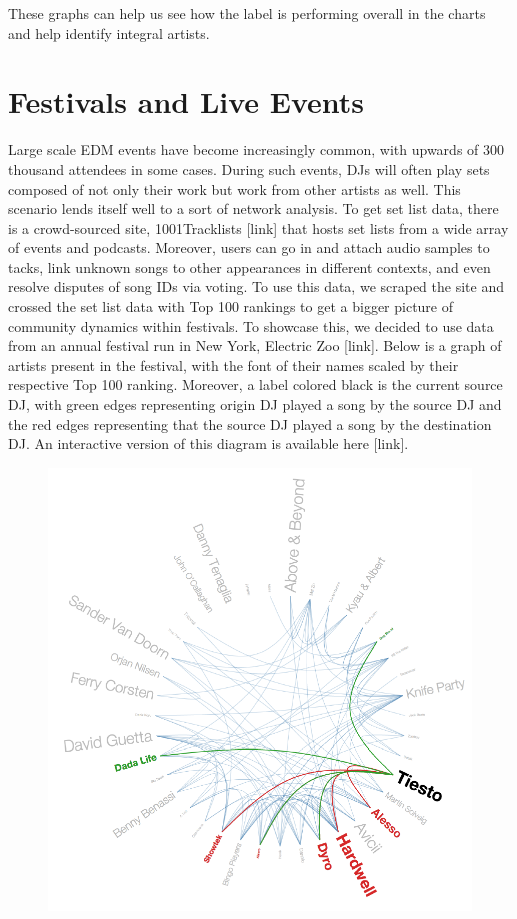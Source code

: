 \documentclass[12pt]{dalcsthesis}
\begin{document}
These graphs can help us see how the label is performing overall in the charts and help identify integral artists. 

\section{Festivals and Live Events}

Large scale EDM events have become increasingly common, with upwards of 300 thousand attendees in some cases. During such events, DJs will often play sets composed of not only their work but work from other artists as well. This scenario lends itself well to a sort of network analysis. To get set list data, there is a crowd-sourced site, 1001Tracklists [link] that hosts set lists from a wide array of events and podcasts. Moreover, users can go in and attach audio samples to tacks, link unknown songs to other appearances in different contexts, and even resolve disputes of song IDs via voting. To use this data, we scraped the site and crossed the set list data with Top 100 rankings to get a bigger picture of community dynamics within festivals. To showcase this, we decided to use data from an annual festival run in New York, Electric Zoo [link]. Below is a graph of artists present in the festival, with the font of their names scaled by their respective Top 100 ranking. Moreover, a label colored black is the current source DJ, with green edges representing origin DJ played a song by the source DJ and the red edges representing that the source DJ played a song by the destination DJ. An interactive version of this diagram is available here [link]. 

\begin{figure}[h]
\includegraphics[scale=.7]{network_diagram}
\centering
\end{figure}
\end{document}
